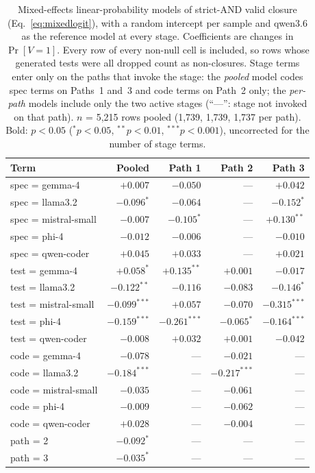 \begin{table}[!htbp]
\centering
\small
\caption{Mixed-effects linear-probability models of strict-AND valid closure (Eq.~\ref{eq:mixedlogit}), with a random intercept per sample and qwen3.6 as the reference model at every stage. Coefficients are changes in $\Pr[V = 1]$. Every row of every non-null cell is included, so rows whose generated tests were all dropped count as non-closures. Stage terms enter only on the paths that invoke the stage: the \emph{pooled} model codes spec terms on Paths~1 and~3 and code terms on Path~2 only; the \emph{per-path} models include only the two active stages (``---'': stage not invoked on that path). $n$ = 5{,}215 rows pooled (1{,}739, 1{,}739, 1{,}737 per path). Bold: $p < 0.05$ ($^{*}p < 0.05$, $^{**}p < 0.01$, $^{***}p < 0.001$), uncorrected for the number of stage terms.}
\label{tab:mixed_logit}
\begin{tabular}{@{}lrrrr@{}}
\toprule
Term & Pooled & Path 1 & Path 2 & Path 3 \\
\midrule
spec = gemma-4 & $+0.007$ & $-0.050$ & --- & $+0.042$ \\
spec = llama3.2 & \textbf{$-0.096^{*}$} & $-0.064$ & --- & \textbf{$-0.152^{*}$} \\
spec = mistral-small & $-0.007$ & \textbf{$-0.105^{*}$} & --- & \textbf{$+0.130^{**}$} \\
spec = phi-4 & $-0.012$ & $-0.006$ & --- & $-0.010$ \\
spec = qwen-coder & $+0.045$ & $+0.033$ & --- & $+0.021$ \\
\midrule
test = gemma-4 & \textbf{$+0.058^{*}$} & \textbf{$+0.135^{**}$} & $+0.001$ & $-0.017$ \\
test = llama3.2 & \textbf{$-0.122^{**}$} & $-0.116$ & $-0.083$ & \textbf{$-0.146^{*}$} \\
test = mistral-small & \textbf{$-0.099^{***}$} & $+0.057$ & $-0.070$ & \textbf{$-0.315^{***}$} \\
test = phi-4 & \textbf{$-0.159^{***}$} & \textbf{$-0.261^{***}$} & \textbf{$-0.065^{*}$} & \textbf{$-0.164^{***}$} \\
test = qwen-coder & $-0.008$ & $+0.032$ & $+0.001$ & $-0.042$ \\
\midrule
code = gemma-4 & $-0.078$ & --- & $-0.021$ & --- \\
code = llama3.2 & \textbf{$-0.184^{***}$} & --- & \textbf{$-0.217^{***}$} & --- \\
code = mistral-small & $-0.035$ & --- & $-0.061$ & --- \\
code = phi-4 & $-0.009$ & --- & $-0.062$ & --- \\
code = qwen-coder & $+0.028$ & --- & $-0.004$ & --- \\
\midrule
path = 2 & \textbf{$-0.092^{*}$} & --- & --- & --- \\
path = 3 & \textbf{$-0.035^{*}$} & --- & --- & --- \\
\bottomrule
\end{tabular}
\end{table}
